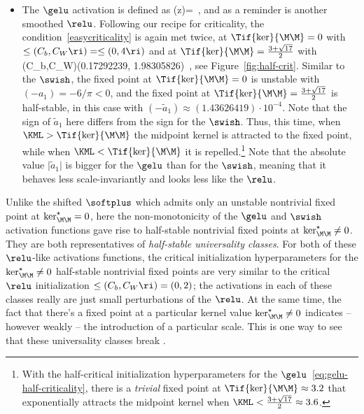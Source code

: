 \begin{itemize}
\item The $\gelu$ activation is defined as 
\be
\sigma(z)=\, ,
\ee
and as a reminder is another smoothed $\relu$.
Following our recipe for criticality, the condition~\eqref{easycriticality} is again met twice, at $\Tif{\ker}{\M\M}=0$ with $\le(C_b,C_W\ri)=\le(0,4\ri)$ and at
 $\Tif{\ker}{\M\M}=\frac{3+\sqrt{17}}{2}$ with
 \be\label{eq:gelu-half-criticality}
 \le(C_b,C_W\ri)\approx\le(0.17292239, 1.98305826\ri)\, ,
\ee
see Figure~\ref{fig:half-crit}.
Similar to the $\swish$, the fixed point at $\Tif{\ker}{\M\M}=0$ is unstable with $(-a_1)=-6/\pi<0$, and the fixed point at $\Tif{\ker}{\M\M}=\frac{3+\sqrt{17}}{2}$ is half-stable, in this case with
$(-\tilde{a}_1)\approx (1.43626419)\cdot 10^{-4}$.
Note that the sign of $\tilde{a}_1$ here differs from the sign for the $\swish$.
Thus, this time, when $\KML>\Tif{\ker}{\M\M}$ the midpoint kernel is attracted to the fixed point, while when $\KML<\Tif{\ker}{\M\M}$ it is repelled.\footnote{With the half-critical initialization hyperparameters for the $\gelu$~\eqref{eq:gelu-half-criticality}, there is a \emph{trivial} fixed point at $\Tif{\ker}{\M\M}\approx 3.2$ that exponentially attracts the midpoint kernel when $\KML<\frac{3+\sqrt{17}}{2}\approx 3.6$.} 
Note that the absolute value $\vert \tilde{a}_1\vert $ is bigger for the $\gelu$ than for the $\swish$, meaning that it behaves less scale-invariantly and looks less like the $\relu$. 
\end{itemize} 
Unlike the shifted $\softplus$ which admits only an unstable nontrivial fixed point at $\ker_{\M\M}^{\star}=0$, here the non-monotonicity of the $\gelu$ and $\swish$ activation functions gave rise to half-stable nontrivial fixed points at $\ker_{\M\M}^{\star}\ne 0$.
They are both representatives of \emph{half-stable universality classes}.
For both of these $\relu$-like activations functions, the critical initialization hyperparameters for the $\ker_{\M\M}^{\star}\ne 0$ half-stable nontrivial fixed points are very similar to the critical $\relu$ initialization $\le(C_b,C_W\ri) = (0,2)$;
the activations in each of these classes really are just small perturbations of the $\relu$. At the same time, the fact that there's a fixed point at a particular kernel value $\ker_{\M\M}^{\star}\ne 0$ indicates -- however weakly -- the introduction of a particular scale. This is one way to see that these universality classes break .

